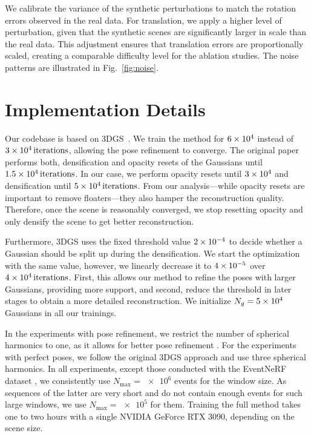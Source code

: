 We calibrate the variance of the synthetic perturbations to match the rotation errors observed in the real data. For translation, we apply a higher level of perturbation, given that the synthetic scenes are significantly larger in scale than the real data. This adjustment ensures that translation errors are proportionally scaled, creating a comparable difficulty level for the ablation studies. The noise patterns are illustrated in Fig.~\ref{fig:noise}.





\section{Implementation Details}
\label{sec:supp_implementation_details}

Our codebase is based on 3DGS~\cite{3dgs}. We train the method for $\qty{6d4}{}$ instead of $\qty{3d4}{iterations}$, allowing the pose refinement to converge. 
The original paper performs both, densification and opacity resets of the Gaussians until $\qty{1.5d4}{iterations}$.
In our case, we perform opacity resets until $\num{3d4}$ and densification until $\qty{5d4}{iterations}$. 
From our analysis---while opacity resets are important to remove floaters---they also hamper the reconstruction quality. 
Therefore, once the scene is reasonably converged, we stop resetting opacity and only densify the scene to get better reconstruction. 


Furthermore, 3DGS uses the fixed threshold value $\num{2d-4}$ to decide whether a Gaussian should be split up during the densification.
We start the optimization with the same value,  however, we linearly decrease it to $\num{4d-5}$ over ${\qty{4d4}{iterations}}$.
First, this allows our method to refine the poses with larger Gaussians, providing more support, and second, reduce the threshold in later stages to obtain a more detailed reconstruction.
We initialize $N_g={\qty{5d4}{}}$ Gaussians in all our trainings. 





In the experiments with pose refinement, we restrict the number of spherical harmonics to one, as it allows for better pose refinement \cite{3dgsslam, splatam}. 
For the experiments with perfect poses, we follow the original 3DGS approach and use three spherical harmonics. 
In all experiments, except those conducted with the EventNeRF dataset \cite{eventnerf}, we consistently use $N_\text{max}{=}\num{e6}$ events for the window size. 
As sequences of the latter are very short and do not contain enough events for such large windows, we use $N_\text{max}{=}\num{e5}$ for them. 
Training the full method takes one to two hours with a single NVIDIA GeForce RTX 3090, depending on the scene size. 

